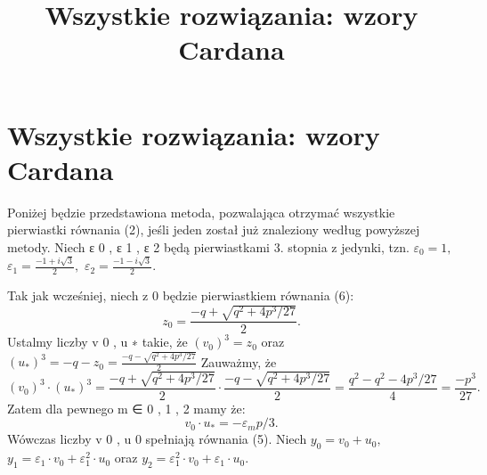 \documentclass{article}
\begin{document}
\title{Wszystkie rozwiązania: wzory Cardana}
\maketitle

\section{Wszystkie rozwiązania: wzory Cardana}
Poniżej będzie przedstawiona metoda, pozwalająca otrzymać wszystkie pierwiastki równania (2), jeśli jeden został już znaleziony według powyższej metody. Niech ε 0 , ε 1 , ε 2  będą pierwiastkami 3. stopnia z jedynki, tzn. 
$\varepsilon_0=1,$ $\varepsilon_1=\frac{-1 + i\sqrt 3}{2},$ $\varepsilon_2= \frac{-1 - i\sqrt 3}{2}.$

Tak jak wcześniej, niech z 0 będzie pierwiastkiem równania (6): 
$$z_0=\frac{-q+\sqrt{q^2+4p^3/27}}{2}.$$
Ustalmy liczby v 0 , u ∗ takie, że 
$(v_0)^3=z_0$ oraz $(u_*)^3=-q-z_0=\frac{-q-\sqrt{q^2+4p^3/27}}{2}$
Zauważmy, że 
$$(v_0)^3\cdot (u_*)^3=\frac{-q+\sqrt{q^2+4p^3/27}}{2}\cdot \frac{-q-\sqrt{q^2+4p^3/27}}{2}=\frac{q^2-q^2-4p^3/27}{4}=\frac{-p^3}{27}.$$
Zatem dla pewnego m ∈ { 0 , 1 , 2 }mamy że:
$$v_0\cdot u_*=-\varepsilon_m p/3.$$
Wówczas liczby v 0 , u 0 spełniają równania (5). Niech 
$y_0=v_0+u_0,$ $y_1=\varepsilon_1\cdot v_0+\varepsilon_1^2\cdot u_0$ oraz $y_2=\varepsilon_1^2\cdot v_0+\varepsilon_1\cdot u_0.$
\end{document}
